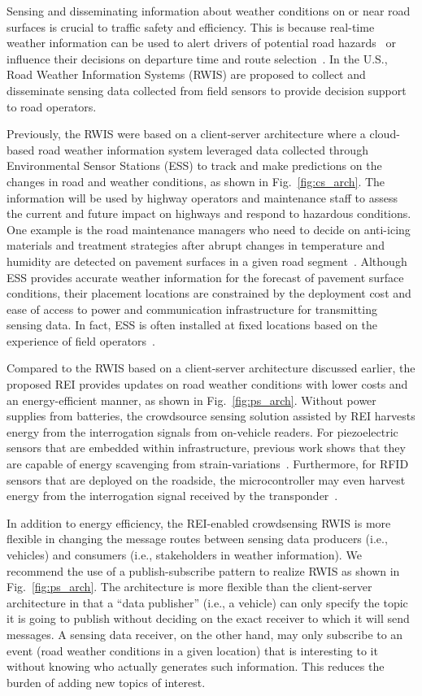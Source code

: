 \documentclass[lettersize,journal]{IEEEtran}
\begin{document}
Sensing and disseminating information about weather conditions on or near road surfaces is crucial to traffic safety and efficiency. This is because real-time weather information can be used to alert drivers of potential road hazards~\cite{Alfelorweather2005} or influence their decisions on departure time and route selection~\cite{FHWAweather}. In the U.S., Road Weather Information Systems (RWIS) are proposed to collect and disseminate sensing data collected from field sensors to provide decision support to road operators.

Previously, the RWIS were based on a client-server architecture where a cloud-based road weather information system leveraged data collected through Environmental Sensor Stations (ESS) to track and make predictions on the changes in road and weather conditions, as shown in Fig.~\ref{fig:cs_arch}. The information will be used by highway operators and maintenance staff to assess the current and future impact on highways and respond to hazardous conditions. One example is the road maintenance managers who need to decide on anti-icing materials and treatment strategies after abrupt changes in temperature and humidity are detected on pavement surfaces in a given road segment~\cite{manfredi2008road}. Although ESS provides accurate weather information for the forecast of pavement surface conditions, their placement locations are constrained by the deployment cost and ease of access to power and communication infrastructure for transmitting sensing data. In fact, ESS is often installed at fixed locations based on the experience of field operators~\cite{jin2014determining}.

Compared to the RWIS based on a client-server architecture discussed earlier, the proposed REI provides updates on road weather conditions with lower costs and an energy-efficient manner, as shown in Fig.~\ref{fig:ps_arch}. Without power supplies from batteries, the crowdsource sensing solution assisted by REI harvests energy from the interrogation signals from on-vehicle readers. For piezoelectric sensors that are embedded within infrastructure, previous work shows that they are capable of energy scavenging from strain-variations~\cite{aono2016infrastructural}. Furthermore, for RFID sensors that are deployed on the roadside, the microcontroller may even harvest energy from the interrogation signal received by the transponder~\cite{costa2021review}.

In addition to energy efficiency, the REI-enabled crowdsensing RWIS is more flexible in changing the message routes between sensing data producers (i.e., vehicles) and consumers (i.e., stakeholders in weather information). We recommend the use of a publish-subscribe pattern to realize RWIS as shown in Fig.~\ref{fig:ps_arch}. The architecture is more flexible than the client-server architecture in that a “data publisher” (i.e., a vehicle) can only specify the topic it is going to publish without deciding on the exact receiver to which it will send messages. A sensing data receiver, on the other hand, may only subscribe to an event (road weather conditions in a given location) that is interesting to it without knowing who actually generates such information. This reduces the burden of adding new topics of interest.
\end{document}
